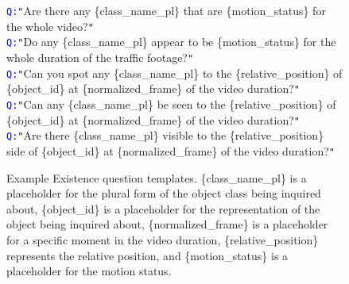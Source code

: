 \begin{figure*}[htbp]
\begin{tcolorbox}[colback=gray!10,%
	colframe=black,%
	width=\textwidth,
	arc=1mm, auto outer arc,
	boxrule=0.5pt,
	]
	\texttt{\textcolor{blue}{Q:}}\texttt{"}Are there any \mbox{\{class\_name\_pl\}} that are \mbox{\{motion\_status\}} for the whole video?\texttt{"}\\
        \texttt{\textcolor{blue}{Q:}}\texttt{"}Do any \mbox{\{class\_name\_pl\}} appear to be \mbox{\{motion\_status\}} for the whole duration of the traffic footage?\texttt{"}\\
        \texttt{\textcolor{blue}{Q:}}\texttt{"}Can you spot any \mbox{\{class\_name\_pl\}} to the \mbox{\{relative\_position\}} of \mbox{\{object\_id\}} at \mbox{\{normalized\_frame\}} of the video duration?\texttt{"}\\
        \texttt{\textcolor{blue}{Q:}}\texttt{"}Can any \mbox{\{class\_name\_pl\}} be seen to the \mbox{\{relative\_position\}} of \mbox{\{object\_id\}} at \mbox{\{normalized\_frame\}} of the video duration?\texttt{"}\\
        \texttt{\textcolor{blue}{Q:}}\texttt{"}Are there \mbox{\{class\_name\_pl\}} visible to the \mbox{\{relative\_position\}} side of \mbox{\{object\_id\}} at \mbox{\{normalized\_frame\}} of the video duration?\texttt{"}\\
        
\end{tcolorbox}
\caption{Example Existence question templates. \mbox{\{class\_name\_pl\}} is a placeholder for the plural form of the object class being inquired about, \mbox{\{object\_id\}} is a placeholder for the representation of the object being inquired about, \mbox{\{normalized\_frame\}} is a placeholder for a specific moment in the video duration, \mbox{\{relative\_position\}} represents the relative position, and \mbox{\{motion\_status\}} is a placeholder for the motion status.}
\label{fig:existence_qa_templates}
\end{figure*}